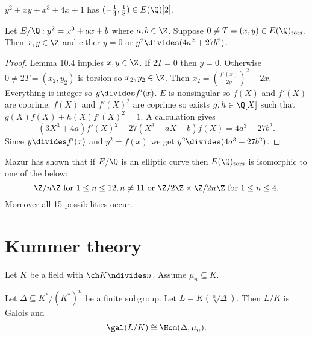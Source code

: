 \documentclass[a4paper]{article}
\theoremstyle{definition}
\begin{document}
\begin{eg}
  \(y^2 + xy + x^3 + 4x + 1\) has \((-\frac{1}{4}, \frac{1}{8}) \in E(\Q)[2]\).
\end{eg}

\begin{theorem}
  Let \(E/\Q: y^2 = x^3 + ax + b\) where \(a, b \in \Z\). Suppose \(0 \neq T = (x, y) \in E(\Q)_{\mathrm{tors}}\). Then \(x, y \in \Z\) and either \(y = 0\) or \(y^2 \divides (4a^2 + 27b^2)\).
\end{theorem}

\begin{proof}
  Lemma 10.4 implies \(x, y \in \Z\). If \(2T = 0\) then \(y = 0\). Otherwise \(0 \neq 2T = (x_2, y_2)\) is torsion so \(x_2, y_2 \in \Z\). Then \(x_2 = \left(\frac{f'(x)}{2y}\right)^2 - 2x\). Everything is integer so \(y \divides f'(x)\). \(E\) is nonsingular so \(f(X)\) and \(f'(X)\) are coprime. \(f(X)\) and \(f'(X)^2\) are coprime so exists \(g, h \in \Q[X]\) such that \(g(X) f(X) + h(X) f'(X)^2 = 1\). A calculation gives
  \[
    (3X^3 + 4a) f'(X)^2 - 27(X^3 + aX - b)f(X) = 4a^3 + 27b^2.
  \]
  Since \(y \divides f'(x)\) and \(y^2 = f(x)\) we get \(y^2 \divides (4a^3 + 27b^2)\).
\end{proof}

\begin{remark}
  Mazur has shown that if \(E/\Q\) is an elliptic curve then \(E(\Q)_{\mathrm{tors}}\) is isomorphic to one of the below:
  \[
    \Z/n\Z \text{ for } 1 \leq n \leq 12, n \neq 11 \text{ or } \Z/2\Z \times \Z/2n\Z \text{ for } 1 \leq n \leq 4.
  \]
  Moreover all 15 possibilities occur.
\end{remark}

\section{Kummer theory}

Let \(K\) be a field with \(\ch K \ndivides n\). Assume \(\mu_n \subseteq K\).

\begin{lemma}
  Let \(\Delta \subseteq K^*/(K^*)^n\) be a finite subgroup. Let \(L = K(\sqrt[n]{\Delta})\). Then \(L/K\) is Galois and
  \[
    \gal(L/K) \cong \Hom(\Delta, \mu_n).
  \]
\end{lemma}
\end{document}
